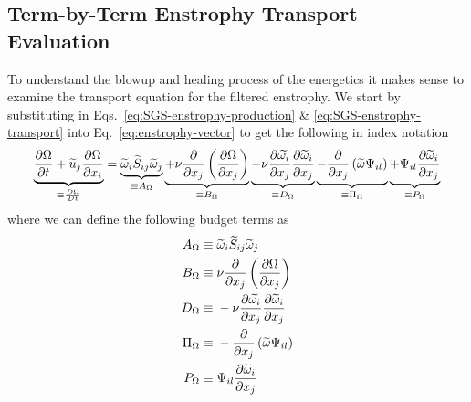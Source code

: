 \newcommand{\pienst}{\Pi_{\Omega}}
\newcommand{\penst}{P_{\Omega}}
\newcommand{\aenst}{A_{\Omega}}
\newcommand{\benst}{B_{\Omega}}
\newcommand{\denst}{D_{\Omega}}
\newcommand{\matderv}[1]{\frac{D#1}{Dt}}

\subsection{Term-by-Term Enstrophy Transport Evaluation}
To understand the blowup and healing process of the energetics it makes sense to examine the
transport equation for the filtered enstrophy. We start by substituting in
Eqs.~\ref{eq:SGS-enstrophy-production} \& \ref{eq:SGS-enstrophy-transport} into
Eq.~\ref{eq:enstrophy-vector} to get the following in index notation
\begin{equation}
    \underbrace{\pdv{\Omega}{t} + \widetilde{u}_{j} \pdv{\Omega}{x_{i}}}_{\equiv \matderv{\Omega}} =
        \underbrace{\widetilde{\omega}_{i} \widetilde{S}_{ij} \widetilde{\omega}_{j}}_{\equiv A_{\Omega}}
        \underbrace{+ \nu \pdv{}{x_{j}} \left( \pdv{\Omega}{x_{j}} \right)}_{\equiv B_{\Omega}}
        \underbrace{- \nu \pdv{\widetilde{\omega_{i}}}{x_{j}}\pdv{\widetilde{\omega}_{i}}{x_{j}}}_{\equiv D_{\Omega}}
        \underbrace{- \pdv{}{x_{j}} \left(\widetilde{\omega} \Psi_{il}\right)}_{\equiv \Pi_{\Omega}} 
        \underbrace{+ \Psi_{il} \pdv{\widetilde{\omega}_{i}}{x_{j}}}_{\equiv P_{\Omega}} 
        \label{eq:enstrophy-transport}
\end{equation}
where we can define the following budget terms as
\begin{subequations}
    \begin{align}
        A_{\Omega} \equiv \; &
            \widetilde{\omega}_{i} \widetilde{S}_{ij} \widetilde{\omega}_{j}\\
        B_{\Omega} \equiv \; &
            \nu \pdv{}{x_{j}} \left( \pdv{\Omega}{x_{j}} \right)\\
        D_{\Omega} \equiv \; &
            -\nu \pdv{\widetilde{\omega_{i}}}{x_{j}}\pdv{\widetilde{\omega}_{i}}{x_{j}}\\
        \Pi_{\Omega} \equiv \; &
            -\pdv{}{x_{j}} \left(\widetilde{\omega} \Psi_{il}\right)\\
        P_{\Omega} \equiv \; &
            \Psi_{il} \pdv{\widetilde{\omega}_{i}}{x_{j}}
    \end{align}
\end{subequations}

